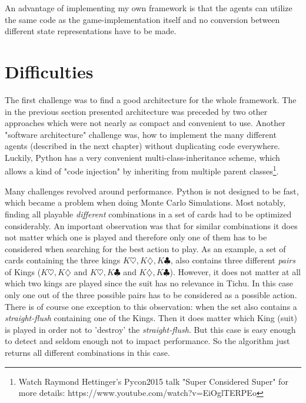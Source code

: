 An advantage of implementing my own framework is that the agents can utilize the same code as the game-implementation itself and no conversion between different state representations have to be made.

\section{Difficulties}
The first challenge was to find a good architecture for the whole framework. The in the previous section presented architecture was preceded by two other approaches which were not nearly as compact and convenient to use.
Another "software architecture" challenge was, how to implement the many different agents (described in the next chapter) without duplicating code everywhere. Luckily, Python has a very convenient multi-class-inheritance scheme, which allows a kind of "code injection" by inheriting from multiple parent classes\footnote{Watch Raymond Hettinger's Pycon2015 talk "Super Considered Super" for more details: https://www.youtube.com/watch?v=EiOglTERPEo}.

Many challenges revolved around performance. Python is not designed to be fast, which became a problem when doing Monte Carlo Simulations. Most notably, finding all playable \textit{different} combinations in a set of cards had to be optimized considerably.
An important observation was that for similar combinations it does not matter which one is played and therefore only one of them has to be considered when searching for the best action to play.
As an example, a set of cards containing the three kings $K\heartsuit, K\diamondsuit, K\clubsuit$, also contains three different \textit{pairs} of Kings ($K\heartsuit, K\diamondsuit$ and $K\heartsuit, K\clubsuit$ and $K\diamondsuit, K\clubsuit$). However, it does not matter at all which two kings are played since the suit has no relevance in Tichu. In this case only one out of the three possible pairs has to be considered as a possible action. There is of course one exception to this observation: when the set also contains a \textit{straight-flush} containing one of the Kings. Then it does matter which King (suit) is played in order not to 'destroy' the \textit{straight-flush}. But this case is easy enough to detect and seldom enough not to impact performance. So the algorithm just returns all different combinations in this case.
